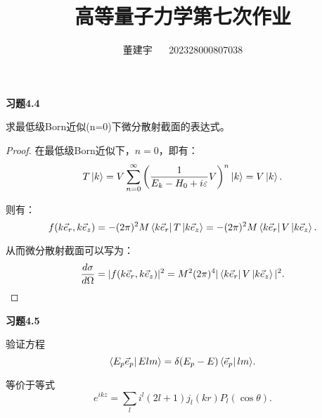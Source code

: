\documentclass[reqno,a4paper,12pt]{amsart}
\title{高等量子力学第七次作业}
\author{董建宇 ~~ 202328000807038}
\begin{document}
\maketitle

\textbf{习题4.4}

求最低级Born近似(n=0)下微分散射截面的表达式。

\begin{proof}

在最低级Born近似下，$n=0$，即有：
\[
	T \ket{k} = V \sum_{n=0}^\infty \left( \frac{1}{E_k-H_0+i\varepsilon} V \right)^n \ket{k} = V \ket{k}.
\]

则有：
\[
	f(k\vec{e}_r, k\vec{e}_z) = -(2\pi)^2 M \bra{k\vec{e}_r} T \ket{k\vec{e}_z} = -(2\pi)^2 M \bra{k\vec{e}_r} V \ket{k\vec{e}_z}.
\]

从而微分散射截面可以写为：
\[
	\frac{d\sigma}{d\Omega} = \vert f(k\vec{e}_r, k\vec{e}_z) \vert^2 = M^2(2\pi)^4 \vert \bra{k\vec{e}_r} V \ket{k\vec{e}_z} \vert^2.
\]

\end{proof}

\medskip

\textbf{习题4.5}

验证方程
\[
	\bra{E_p \vec{e}_p} Elm \rangle = \delta(E_p - E) \bra{\vec{e}_p} lm \rangle.
\]

等价于等式
\[
	e^{ikz} = \sum_l i^l(2l+1) j_l(kr) P_l(\cos\theta).
\]
\end{document}
